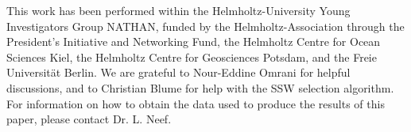 \documentclass[draft,jgrga]{agutex}
\begin{document}
\begin{article}
\begin{acknowledgments}
This work has been performed within the Helmholtz-University Young Investigators Group NATHAN, funded by the Helmholtz-Association through the President's Initiative and Networking Fund, the Helmholtz Centre for Ocean Sciences Kiel, the Helmholtz Centre for Geosciences Potsdam, and the Freie Universit\"at Berlin.
We are grateful to Nour-Eddine Omrani for helpful discussions, and to Christian Blume for help with the SSW selection algorithm.
For information on how to obtain the data used to produce the results of this paper, please contact Dr. L. Neef.
\end{acknowledgments}

%
%
%
%
%
%
%
%
%








\end{article}
\end{document}
